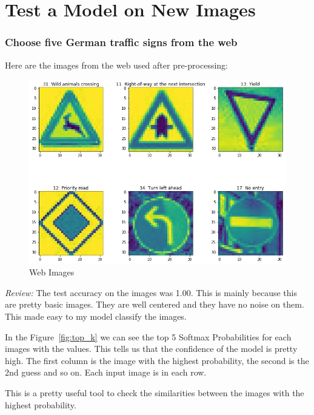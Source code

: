 \documentclass[11pt, a4paper]{article}
\begin{document}
\section{Test a Model on New Images}%
\label{sec:test_a_model_on_new_images}

\subsubsection{Choose five German traffic signs from the web}%
\label{ssub:choose_five_german_traffic_signs_from_the_web}

Here are the images from the web used after pre-processing:
\begin{figure}[htpb]
	\centering
	\includegraphics[width=0.8\linewidth]{web_images}
	\caption{Web Images}
	\label{fig:web_images}
\end{figure}


\textit{Review: }The test accuracy on the images was 1.00. This is mainly because this are pretty basic images. They are well centered and they have no noise on them. This made easy to my model classify the images.  








In the Figure~\ref{fig:top_k} we can see the top 5 Softmax Probabilities for each images with the values. This tells us that the confidence of the model is pretty high. The first column is the image with the highest probability, the second is the 2nd guess and so on. Each input image is in each row. 


This is a pretty useful tool to check the similarities between the images with the highest probability.
\end{document}
